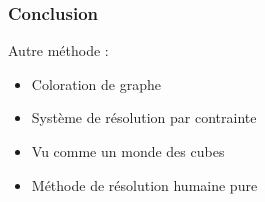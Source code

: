 
\begin{frame}
    \frametitle{Conclusion}
    Autre méthode :
    \begin{itemize}
    		\item Coloration de graphe
    		\item Système de résolution par contrainte
    		\item Vu comme un monde des cubes
    		\item Méthode de résolution humaine pure
    \end{itemize}
\end{frame}
